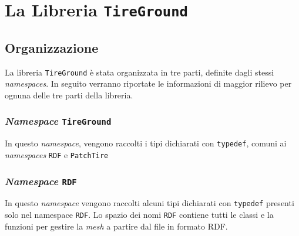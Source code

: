 \chapter{La Libreria \texttt{TireGround}}
\label{Codice}
%
\section{Organizzazione}
La libreria \texttt{TireGround} è stata organizzata in tre parti, definite dagli stessi \textit{namespaces}. In seguito verranno riportate le informazioni di maggior rilievo per ognuna delle tre parti della libreria.
%
\subsection{\textit{Namespace} \texttt{TireGround}}
In questo \textit{namespace}, vengono raccolti i tipi dichiarati con \texttt{typedef}, comuni ai \textit{namespaces} \texttt{RDF} e \texttt{PatchTire}
%
\subsection{\textit{Namespace} \texttt{RDF}} 
In questo \textit{namespace} vengono raccolti alcuni tipi dichiarati con \texttt{typedef} presenti solo nel namespace \texttt{RDF}. Lo spazio dei nomi \texttt{RDF} contiene tutti le classi e la funzioni per gestire la \textit{mesh} a partire dal file in formato \ac{RDF}.
%
